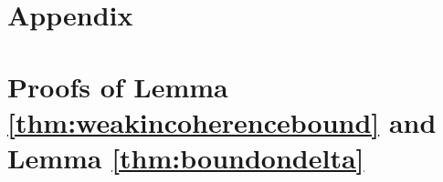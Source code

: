 \documentclass[11pt,letterpaper]{article}
\newtheorem{proposition}[theorem]{Proposition}
\newcommand{\ct}{\mathcal{T}}
\newcommand{\cp}{\mathcal{P}}
\begin{document}

\section*{Appendix}
\appendix

\section{Proofs of Lemma \ref{thm:weakincoherencebound} and Lemma \ref{thm:boundondelta}} \label{apx:prelims}





\end{document}
